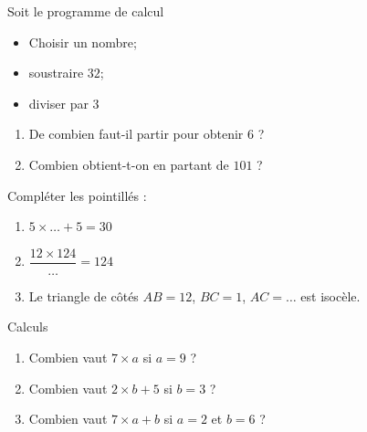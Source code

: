 \begin{MentalActivity}
    
    \begin{mental}
        Soit le programme de calcul
        \begin{framed}
            \begin{itemize}
                \item Choisir un nombre;
                \item soustraire \( 32\);
                \item diviser par 3
            \end{itemize}
        \end{framed}
        \begin{enumerate}
            \item
                De combien faut-il partir pour obtenir \( 6\) ?
            \item
                Combien obtient-t-on en partant de \( 101\) ?
        \end{enumerate}
    \end{mental}

    \begin{mental}
        Compléter les pointillés :
        \begin{enumerate}
            \item
                \( 5\times \ldots +5=30\)
            \item
                \( \dfrac{ 12\times 124 }{ \ldots }=124\)
            \item
                Le triangle de côtés \( AB=12\), \( BC=1\), \( AC=\ldots\) est isocèle.
        \end{enumerate}
    \end{mental}

    \begin{mental}
        Calculs 
        \begin{enumerate}
            \item
                Combien vaut \( 7\times a\) si \( a=9\) ?
            \item
                Combien vaut \( 2\times b+5\) si \( b=3\) ?
            \item
                Combien vaut \( 7\times a+b\) si \( a=2\) et \( b=6\) ?
        \end{enumerate}
    \end{mental}
\end{MentalActivity}

